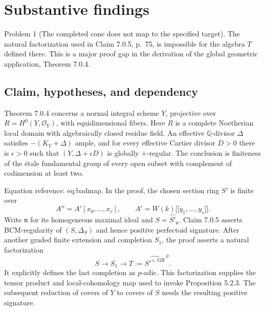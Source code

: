 \documentclass[10pt]{article}
\begin{document}
\section*{Substantive findings}
Problem 1 (The completed cone does not map to the specified target).  The natural factorization used in Claim 7.0.5, p. 75, is impossible for the algebra \(T\) defined there. This is a major proof gap in the derivation of the global geometric application, Theorem 7.0.4.\par
\subsection*{Claim, hypotheses, and dependency}
Theorem 7.0.4 concerns a normal integral scheme \(Y\), projective over \(R=H^0(Y,\mathcal O_Y)\), with equidimensional fibers. Here \(R\) is a complete Noetherian local domain with algebraically closed residue field. An effective \(\mathbb Q\)-divisor \(\Delta\) satisfies \(-(K_Y+\Delta)\) ample, and for every effective Cartier divisor \(D>0\) there is \(\epsilon>0\) such that \((Y,\Delta+\epsilon D)\) is globally \(+\)-regular. The conclusion is finiteness of the étale fundamental group of every open subset with complement of codimension at least two.\par
Equation reference: eq:badmap. In the proof, the chosen section ring \(S'\) is finite over \[A''=A'[x_0,\ldots,x_r],\qquad
 A'=W(k)\mathopen{[\![}y_1,\ldots,y_s\mathclose{]\!]}.\] Write \(\mathfrak n\) for its homogeneous maximal ideal and \(S=\widehat{S'}_{\mathfrak n}\). Claim 7.0.5 asserts BCM-regularity of \((S,\Delta_S)\) and hence positive perfectoid signature. After another graded finite extension and completion \(S_1\), the proof asserts a natural factorization \[
 S\longrightarrow S_1\longrightarrow
 T:=\widehat{S'^{+,\mathrm{GR}}}^{\,p}.\] It explicitly defines the last completion as \(p\)-adic. This factorization supplies the tensor product and local-cohomology map used to invoke Proposition 5.2.3. The subsequent reduction of covers of \(Y\) to covers of \(S\) needs the resulting positive signature.\par
\end{document}
